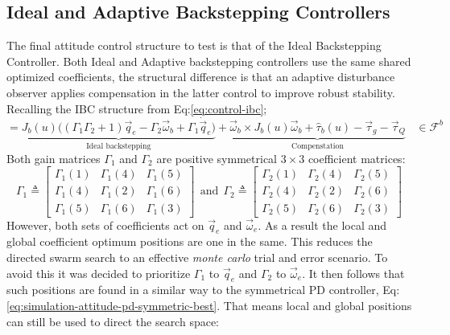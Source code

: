 \subsection{Ideal and Adaptive Backstepping Controllers}
The final attitude control structure to test is that of the Ideal Backstepping Controller. Both Ideal and Adaptive backstepping controllers use the same shared optimized coefficients, the structural difference is that an adaptive disturbance observer applies compensation in the latter control to improve robust stability. Recalling the IBC structure from Eq:\ref{eq:control-ibc};
\begin{equation}\label{eq:simulation-attitude-ibc}
=\underbrace{J_b(u)\Big((\Gamma_1\Gamma_2+1)\vec{q}_e-\Gamma_2\vec{\omega}_b+\Gamma_1\dot{\vec{q}}_e \Big)}_{\text{Ideal backstepping}}
+\underbrace{\vec{\omega}_b\times J_b(u)\vec{\omega}_b+\hat{\tau}_b(u)-\vec{\tau}_g-\vec{\tau}_Q}_{\text{Compenstation}}~~~~\in\mathcal{F}^{b}
\end{equation}
Both gain matrices $\Gamma_1$ and $\Gamma_2$ are positive symmetrical $3\times 3$ coefficient matrices:
\begin{equation}\label{eq:simulation-attitde-ibc-coefficients}
\Gamma_1\triangleq \begin{bmatrix}
\Gamma_1(1) & \Gamma_1(4) & \Gamma_1(5)\\
\Gamma_1(4) & \Gamma_1(2) & \Gamma_1(6)\\
\Gamma_1(5) & \Gamma_1(6) & \Gamma_1(3)
\end{bmatrix}
~~\text{and}~~
\Gamma_2\triangleq \begin{bmatrix}
\Gamma_2(1) & \Gamma_2(4) & \Gamma_2(5)\\
\Gamma_2(4) & \Gamma_2(2) & \Gamma_2(6)\\
\Gamma_2(5) & \Gamma_2(6) & \Gamma_2(3)
\end{bmatrix}
\end{equation}
However, both sets of coefficients act on $\vec{q}_e$ and $\vec{\omega}_e$. As a result the local and global coefficient optimum positions are one in the same. This reduces the directed swarm search to an effective \emph{monte carlo} trial and error scenario. To avoid this it was decided to prioritize $\Gamma_1$ to $\vec{q}_e$ and $\Gamma_2$ to $\vec{\omega}_e$. It then follows that such positions are found in a similar way to the symmetrical PD controller, Eq:\ref{eq:simulation-attitude-pd-symmetric-best}. That means local and global positions can still be used to direct the search space:

